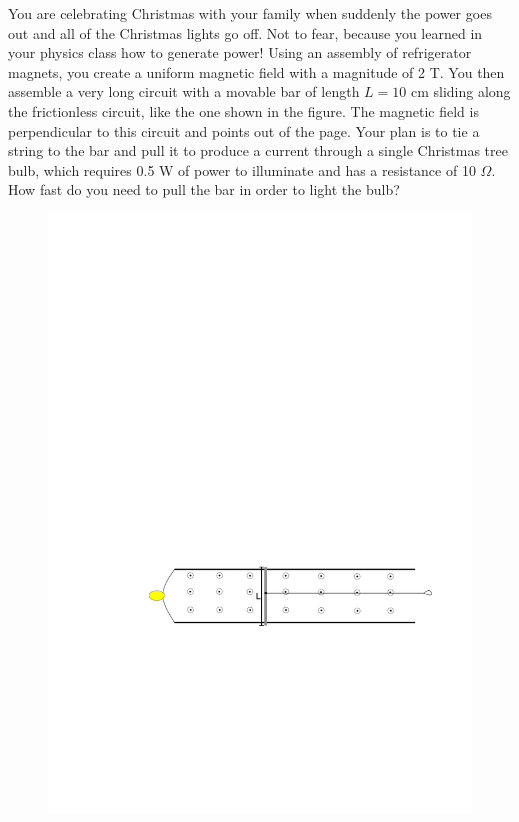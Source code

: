 \question You are celebrating Christmas with your family when suddenly the power goes out and all of the Christmas lights go off. Not to fear, because you learned in your physics class how to generate power! Using an assembly of refrigerator magnets, you create a uniform magnetic field with a magnitude of 2 T. You then assemble a very long circuit with a movable bar of length $L=10$ cm sliding along the frictionless circuit, like the one shown in the figure. The magnetic field is perpendicular to this circuit and points out of the page. Your plan is to tie a string to the bar and pull it to produce a current through a single Christmas tree bulb, which requires 0.5 W of power to illuminate and has a resistance of 10 $\Omega$. How fast do you need to pull the bar in order to light the bulb?

\begin{figure}[ht!]
	\centering
	\includegraphics[width=12cm]{motional_emf.pdf}
\end{figure} 